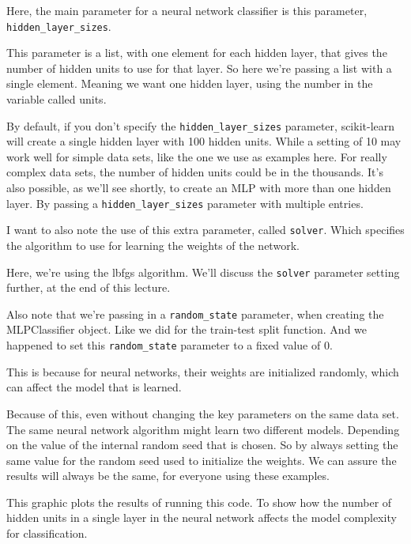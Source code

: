 \begin{multicols}{2}
Here, the main parameter for a neural network classifier is this parameter, \texttt{hidden_layer_sizes}. 

This parameter is a list, with one element for each hidden layer, that gives the number of hidden units to use for that layer. So here we're passing a list with a single element. Meaning we want one hidden layer, using the number in the variable called units. 

By default, if you don't specify the \texttt{hidden_layer_sizes} parameter, scikit-learn will create a single hidden layer with 100 hidden units. While a setting of 10 may work well for simple data sets, like the one we use as examples here. For really complex data sets, the number of hidden units could be in the thousands. It's also possible, as we'll see shortly, to create an MLP with more than one hidden layer. By passing a \texttt{hidden_layer_sizes} parameter with multiple entries. 

I want to also note the use of this extra parameter, called \texttt{solver}. Which specifies the algorithm to use for learning the weights of the network. 

Here, we're using the lbfgs algorithm. We'll discuss the \texttt{solver} parameter setting further, at the end of this lecture. 

Also note that we're passing in a \texttt{random_state} parameter, when creating the MLPClassifier object. Like we did for the train-test split function. And we happened to set this \texttt{random_state} parameter to a fixed value of 0. 

This is because for neural networks, their weights are initialized randomly, which can affect the model that is learned. 

Because of this, even without changing the key parameters on the same data set. The same neural network algorithm might learn two different models. Depending on the value of the internal random seed that is chosen. So by always setting the same value for the random seed used to initialize the weights. We can assure the results will always be the same, for everyone using these examples. 

This graphic plots the results of running this code. To show how the number of hidden units in a single layer in the neural network affects the model complexity for classification. 


\end{multicols}
